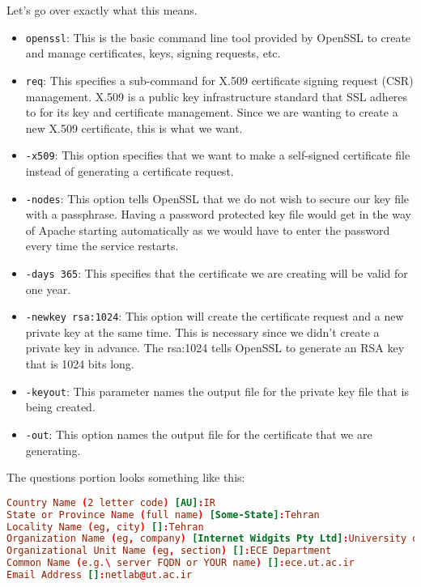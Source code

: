 \documentclass{../UTNetLab}
\begin{document}
        Let's go over exactly what this means.

        \begin{itemize}
            \item \lstinline{openssl}: This is the basic command line tool provided by OpenSSL to create and manage certificates, keys, signing requests, etc.
            \item \lstinline{req}: This specifies a sub-command for X.509 certificate signing request (CSR) management.
                X.509 is a public key infrastructure standard that SSL adheres to for its key and certificate management.
                Since we are wanting to create a new X.509 certificate, this is what we want.
            \item \lstinline{-x509}: This option specifies that we want to make a self-signed certificate file instead of generating a certificate request.
            \item \lstinline{-nodes}: This option tells OpenSSL that we do not wish to secure our key file with a passphrase.
                Having a password protected key file would get in the way of Apache starting automatically as we would have to enter the password every time the service restarts.
            \item \lstinline{-days 365}: This specifies that the certificate we are creating will be valid for one year.
            \item \lstinline{-newkey rsa:1024}: This option will create the certificate request and a new private key at the same time.
                This is necessary since we didn't create a private key in advance.
                The rsa:1024 tells OpenSSL to generate an RSA key that is 1024 bits long.
            \item \lstinline{-keyout}: This parameter names the output file for the private key file that is being created.
            \item \lstinline{-out}: This option names the output file for the certificate that we are generating.
        \end{itemize}

    The questions portion looks something like this:
    {\small
    \begin{lstlisting}[language={conf},emph={IR,Tehran,University, of, ECE, Department,ece,ut,ac,ir,netlab,}]
Country Name (2 letter code) [AU]:IR 
State or Province Name (full name) [Some-State]:Tehran 
Locality Name (eg, city) []:Tehran 
Organization Name (eg, company) [Internet Widgits Pty Ltd]:University of Tehran 
Organizational Unit Name (eg, section) []:ECE Department 
Common Name (e.g.\ server FQDN or YOUR name) []:ece.ut.ac.ir
Email Address []:netlab@ut.ac.ir 
    \end{lstlisting}}
\end{document}
